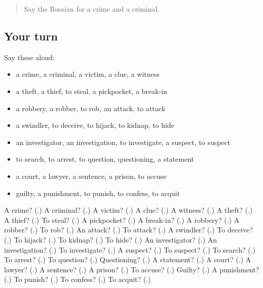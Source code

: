 \begin{quote}
Say the Russian for a crime and a criminal.
\end{quote}

\subsection*{Your turn}
Say these aloud:

\begin{itemize}
\raggedright
  \item a crime, a criminal, a victim, a clue, a witness
  \item a theft, a thief, to steal, a pickpocket, a break-in
  \item a robbery, a robber, to rob, an attack, to attack
  \item a swindler, to deceive, to hijack, to kidnap, to hide
  \item an investigator, an investigation, to investigate, a suspect, to suspect
  \item to search, to arrest, to question, questioning, a statement
  \item a court, a lawyer, a sentence, a prison, to accuse
  \item guilty, a punishment, to punish, to confess, to acquit
\end{itemize}

\begin{tcolorbox}[breakable,colback=teal!4,colframe=teal!35!black,title={Before you move on}]
A crime? (\textbf{}.) A criminal? (\textbf{}.) A victim? (\textbf{}.) A clue? (\textbf{}.) A witness? (\textbf{}.) A theft? (\textbf{}.) A thief? (\textbf{}.) To steal? (\textbf{}.) A pickpocket? (\textbf{}.) A break-in? (\textbf{}.) A robbery? (\textbf{}.) A robber? (\textbf{}.) To rob? (\textbf{}.) An attack? (\textbf{}.) To attack? (\textbf{}.) A swindler? (\textbf{}.) To deceive? (\textbf{}.) To hijack? (\textbf{}.) To kidnap? (\textbf{}.) To hide? (\textbf{}.) An investigator? (\textbf{}.) An investigation? (\textbf{}.) To investigate? (\textbf{}.) A suspect? (\textbf{}.) To suspect? (\textbf{}.) To search? (\textbf{}.) To arrest? (\textbf{}.) To question? (\textbf{}.) Questioning? (\textbf{}.) A statement? (\textbf{}.) A court? (\textbf{}.) A lawyer? (\textbf{}.) A sentence? (\textbf{}.) A prison? (\textbf{}.) To accuse? (\textbf{}.) Guilty? (\textbf{}.) A punishment? (\textbf{}.) To punish? (\textbf{}.) To confess? (\textbf{}.) To acquit? (\textbf{}.)
\end{tcolorbox}
